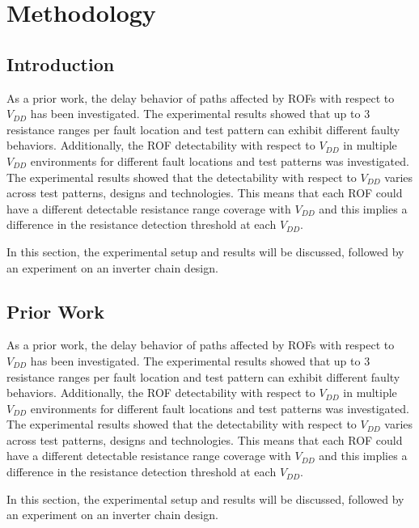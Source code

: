 \chapter{Methodology}
\label{ch3}
\section{Introduction}
As a prior work, the delay behavior of paths affected by ROFs  with respect to $V_{DD}$ has been investigated. The experimental results showed that up to 3 resistance ranges per fault location and test pattern can exhibit different faulty behaviors. Additionally, the ROF detectability with respect to $V_{DD}$ in multiple $V_{DD}$ environments for different fault locations and test patterns was investigated. The experimental results showed that the detectability with respect to $V_{DD}$ varies across test patterns, designs and technologies. This means that each ROF could have a different detectable resistance range coverage with $V_{DD}$ and this implies a difference in the resistance detection threshold at each $V_{DD}$. \par
In this section, the experimental setup and results will be discussed, followed by an experiment on an inverter chain design.
\section{Prior Work}
\label{sec_ResIntnResDetThr}

As a prior work, the delay behavior of paths affected by ROFs  with respect to $V_{DD}$ has been investigated. The experimental results showed that up to 3 resistance ranges per fault location and test pattern can exhibit different faulty behaviors. Additionally, the ROF detectability with respect to $V_{DD}$ in multiple $V_{DD}$ environments for different fault locations and test patterns was investigated. The experimental results showed that the detectability with respect to $V_{DD}$ varies across test patterns, designs and technologies. This means that each ROF could have a different detectable resistance range coverage with $V_{DD}$ and this implies a difference in the resistance detection threshold at each $V_{DD}$. \par
In this section, the experimental setup and results will be discussed, followed by an experiment on an inverter chain design.

